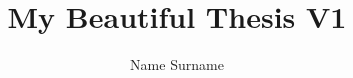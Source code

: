 \documentclass[english, LaM, oneside, noexaminfo]{uaqthesis}
\title{My Beautiful Thesis V1}
\author{Name Surname}
\begin{document}
\frontmatter
\maketitle
\dedication{to my family.}



\tableofcontents

\mainmatter





%
%
%
%


\begin{appendices}

\end{appendices}

\backmatter
\cleardoublepage
{}



\end{document}
